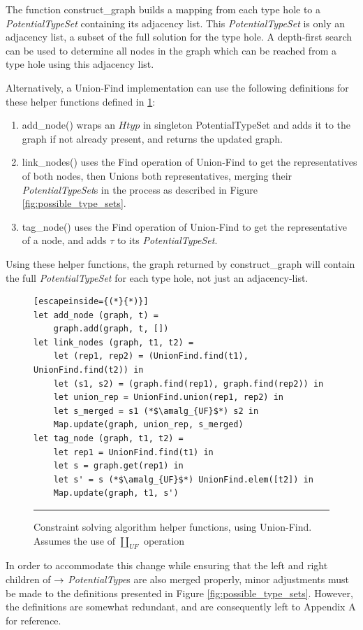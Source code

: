 The function construct\_graph builds a mapping from each type hole to a \emph{PotentialTypeSet} containing its adjacency list. This \textit{PotentialTypeSet} is only an adjacency list, a subset of the full solution for the type hole. A depth-first search can be used to determine all nodes in the graph which can be reached from a type hole using this adjacency list.

Alternatively, a Union-Find implementation can use the following definitions for these helper functions defined in \ref{fig:algcode_construct_graph_helpers}:
\begin{enumerate}
  \item add\_node() wraps an $Htyp$ in singleton PotentialTypeSet and adds it to the graph if not already present, and returns the updated graph.
  \item link\_nodes() uses the Find operation of Union-Find to get the representatives of both nodes, then Unions both representatives, merging their \textit{PotentialTypeSet}s in the process as described in Figure \ref{fig:possible_type_sets}.
  \item tag\_node() uses the Find operation of Union-Find to get the representative of a node, and adds $\tau$ to its \textit{PotentialTypeSet}.
\end{enumerate}
Using these helper functions, the graph returned by construct\_graph will contain the full \textit{PotentialTypeSet} for each type hole, not just an adjacency-list.

\begin{figure}[h!]
\begin{lstlisting}[escapeinside={(*}{*)}]
let add_node (graph, t) =
    graph.add(graph, t, [])
let link_nodes (graph, t1, t2) =
    let (rep1, rep2) = (UnionFind.find(t1), UnionFind.find(t2)) in
    let (s1, s2) = (graph.find(rep1), graph.find(rep2)) in
    let union_rep = UnionFind.union(rep1, rep2) in
    let s_merged = s1 (*$\amalg_{UF}$*) s2 in
    Map.update(graph, union_rep, s_merged)
let tag_node (graph, t1, t2) =
    let rep1 = UnionFind.find(t1) in
    let s = graph.get(rep1) in
    let s' = s (*$\amalg_{UF}$*) UnionFind.elem([t2]) in
    Map.update(graph, t1, s')
\end{lstlisting}
\vspace{-2px}
\hrule
\caption{Constraint solving algorithm helper functions, using Union-Find. Assumes the use of $\amalg_{UF}$ operation}
\label{fig:algcode_construct_graph_helpers}
\end{figure}

In order to accommodate this change while ensuring that the left and right children of $\rightarrow$ \textit{PotentialType}s are also merged properly, minor adjustments must be made to the definitions presented in Figure \ref{fig:possible_type_sets}. However, the definitions are somewhat redundant, and are consequently left to Appendix A for reference.

